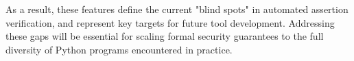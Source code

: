 As a result, these features define the current "blind spots" in automated assertion verification, and represent key targets for future tool development. Addressing these gaps will be essential for scaling formal security guarantees to the full diversity of Python programs encountered in practice.


